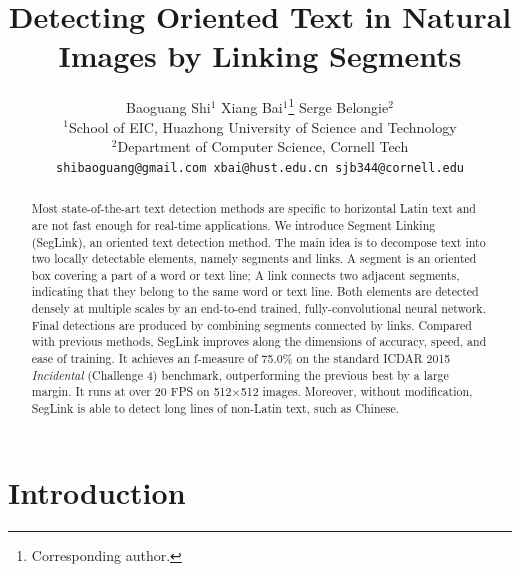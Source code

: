 \documentclass[10pt,twocolumn,letterpaper]{article}
\begin{document}
\title{Detecting Oriented Text in Natural Images by Linking Segments}

\author{Baoguang Shi$^{1}$ \quad Xiang Bai$^{1}$\thanks{Corresponding author.} \quad Serge Belongie$^{2}$\\
$^{1}$School of EIC, Huazhong University of Science and Technology\\
$^{2}$Department of Computer Science, Cornell Tech\\
{\tt\small shibaoguang@gmail.com \quad xbai@hust.edu.cn \quad sjb344@cornell.edu}
}

\maketitle
\thispagestyle{empty}

\begin{abstract}
Most state-of-the-art text detection methods are specific to horizontal Latin text and are not fast enough for real-time applications.
We introduce Segment Linking (SegLink), an oriented text detection method.
The main idea is to decompose text into two locally detectable elements, namely segments and links.
A segment is an oriented box covering a part of a word or text line;
A link connects two adjacent segments, indicating that they belong to the same word or text line.
Both elements are detected densely at multiple scales by an end-to-end trained, fully-convolutional neural network.
Final detections are produced by combining segments connected by links.
Compared with previous methods, SegLink improves along the dimensions of accuracy, speed, and ease of training.
It achieves an f-measure of 75.0\% on the standard ICDAR 2015 \emph{Incidental} (Challenge 4) benchmark, outperforming the previous best by a large margin.
It runs at over 20 FPS on 512$\times$512 images.
Moreover, without modification, SegLink is able to detect long lines of non-Latin text, such as Chinese.
\end{abstract}


\section{Introduction}
\end{document}
